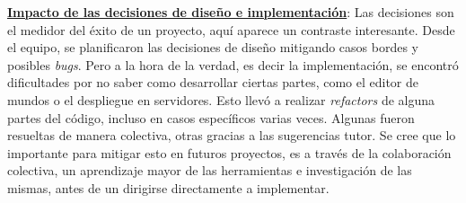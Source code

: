 \vspace{0.25cm}

\textbf{\underline{Impacto de las decisiones de diseño e implementación}}: Las decisiones son el medidor del éxito de un 
proyecto, aquí aparece un contraste interesante. Desde el equipo, se planificaron las decisiones de diseño 
mitigando casos bordes y posibles \textit{bugs}. Pero a la hora de la verdad, es decir la implementación, se encontró dificultades 
por no saber como desarrollar ciertas partes, como el editor de mundos o el despliegue en servidores. Esto llevó a realizar
\textit{refactors} de alguna partes del código, incluso en casos específicos varias veces. Algunas fueron resueltas de manera colectiva, otras 
gracias a las sugerencias tutor. Se cree que lo importante para mitigar esto en futuros proyectos, es a través de la colaboración 
colectiva, un aprendizaje mayor de las herramientas e investigación de las mismas, antes de un dirigirse directamente a 
implementar.

